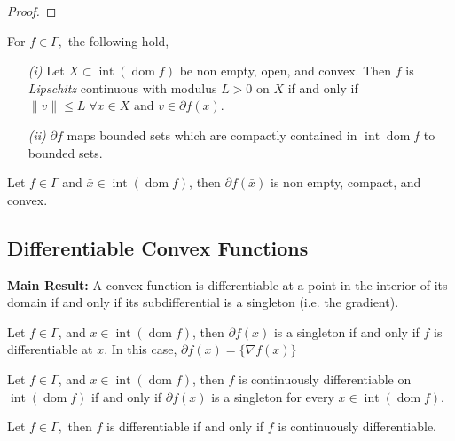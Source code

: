 \documentclass{tufte-handout}
\DeclareMathOperator{\dom}{dom}
\begin{document}
{{\begin{corollary}
\begin{proof}
 \end{proof}
\end{corollary}
\begin{theorem} \label{thm:bounddiff}  
  For $f \in \Gamma,$ the following hold, 
  \begin{enumerate}
    \item[\it (i)] Let $X \subset \operatorname{int} (\dom f)$ be non empty, open, and convex. Then $f$ is \textit{Lipschitz} continuous with modulus $L >0$ on $X$ if and only if $\| v\| \leq L \; \forall x \in X$ and $v \in \partial f(x).$  
    \item[\it (ii)] $\partial f$ maps bounded sets which are compactly contained in $\operatorname{int} \dom f$ to bounded sets. 
  \end{enumerate}
\end{theorem}
\begin{corollary}[]
  Let $f \in \Gamma $ and $\bar x \in \operatorname{int} (\dom f)$, then $\partial f(\bar x)$ is non empty, compact, and convex.
\end{corollary}
\subsection{Differentiable Convex Functions}%
  \label{sub:Differentiable Convex Functions}
 \textbf{Main Result:} A convex function is differentiable at a point in the interior of its domain if and only if its subdifferential is a singleton (i.e. the gradient). 
   \newpage 
\begin{theorem} \label{label}
  Let $f \in \Gamma$, and $x \in \operatorname{int}(\dom f )$, then $\partial f(x)$ is a singleton if and only if $f$ is differentiable at $x.$ In this case, ${\partial f(x) = \{\nabla f(x) \}}$ 
\end{theorem}
\begin{theorem} \label{label}
  Let $f \in \Gamma$, and $x \in \operatorname{int}(\dom f )$, then $f$ is continuously differentiable on $\operatorname{int}(\dom f)$ if and only if $\partial f(x)$ is a singleton for every $x \in \operatorname{int}(\dom f).$ 
\end{theorem}
\begin{corollary}
  Let $f \in \Gamma,$ then $f$ is differentiable if and only if $f$ is continuously differentiable. 
\end{corollary}

}}
\end{document}
